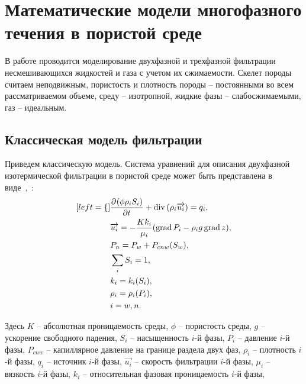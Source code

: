 \chapter{Математические модели многофазного течения в пористой среде} \label{ch:ch1}

\newcommand*{\pd}[3][]{\ensuremath{\dfrac{\partial^{#1} #2}{\partial #3^{#1}}}}
\newcommand*{\dd}[3][]{\ensuremath{\dfrac{\mathrm d^{#1} #2}{\mathrm d #3^{#1}}}}
\newcommand{\grad}{\mathop{\mathrm{grad}}\nolimits}
\newcommand{\diver}{\mathop{\mathrm{div}}\nolimits}

В работе проводится моделирование двухфазной и трехфазной фильтрации
несмешивающихся жидкостей и газа с учетом их сжимаемости. Скелет породы считаем неподвижным, пористость и плотность породы -- постоянными во всем рассматриваемом объеме, среду -- изотропной, жидкие фазы -- слабосжимаемыми, газ -- идеальным.

\section{Классическая модель фильтрации} \label{sec:ch1/sec1}

Приведем классическую модель. Система уравнений для описания двухфазной изотермической фильтрации в пористой среде
может быть представлена в виде~\cite{Aziz-Settari},~\cite{Basniev}:
\begin{subequations} \label{eq:classic_system}
  \begin{align}[left = \empheqlbrace\,]
    &\pd {(\phi \rho_i S_i)}{t} + \diver{(\rho_i \overrightarrow{u_i})} = q_i, \label{eq:classic_system1} \\
    &\overrightarrow{u_i} = -\frac{K k_i}{\mu_i}(\grad {P_i} - {\rho}_i g \grad {z}), \label{eq:classic_system2} \\
    &P_n = P_w + P_{cnw}({S}_w), \label{eq:classic_system3} \\
    &\sum_{i}S_i = 1, \label{eq:classic_system4} \\
    &k_i = k_i({S}_i), \label{eq:classic_system5} \\
    &\rho_i = \rho_i(P_i), \label{eq:classic_system6} \\
    &i = w,n \nonumber .
  \end{align}
\end{subequations}

Здесь
$K$ -- абсолютная проницаемость среды,
$\phi$ -- пористость среды,
$g$ -- ускорение свободного падения,
$S_i$ -- насыщенность $i$-й фазы,
$P_i$ -- давление $i$-й фазы,
$P_{cnw}$ -- капиллярное давление на границе раздела двух фаз,
${\rho}_i$ -- плотность $i$-й фазы,
$q_i$ -- источник $i$-й фазы,
$\overrightarrow{u_i}$ -- скорость фильтрации $i$-й фазы,
$\mu_i$ -- вязкость $i$-й фазы,
$k_i$ -- относительная фазовая проницаемость $i$-й фазы,

